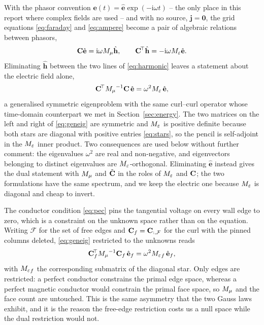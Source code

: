 With the phasor convention $\mathbf{e}(t)=\hat{\mathbf{e}}\exp(-\mathrm{i}\omega t)$ -- the only
place in this
report where complex fields are used -- and with no source, $\mathbf{j}=\mathbf{0}$, the grid
equations
\eqref{eq:faraday} and \eqref{eq:ampere} become a pair of algebraic relations between phasors,
\begin{equation}
  \mathbf{C}\hat{\mathbf{e}} = \mathrm{i}\omega{M_{\mu}}\hat{\mathbf{h}}, \qquad
  \mathbf{C}^{\!\top}\hat{\mathbf{h}} = -\mathrm{i}\omega{M_{\varepsilon}}\hat{\mathbf{e}}.
  \label{eq:harmonic}
\end{equation}
Eliminating $\hat{\mathbf{h}}$ between the two lines of \eqref{eq:harmonic} leaves a statement
about the electric
field alone,
\begin{equation}
  \mathbf{C}^{\!\top}{M_{\mu}}^{-1}\mathbf{C}\,\hat{\mathbf{e}} = \omega^{2}{M_{\varepsilon}}\,\hat{\mathbf{e}},
  \label{eq:geneig}
\end{equation}
a generalised symmetric eigenproblem with the same curl--curl operator whose time-domain
counterpart we met in
Section~\ref{sec:energy}. The two matrices on the left and right of \eqref{eq:geneig} are symmetric
and
${M_{\varepsilon}}$ is positive definite because both stars are diagonal with positive entries \eqref{eq:stars},
so the pencil
is self-adjoint in the ${M_{\varepsilon}}$ inner product. Two consequences are used below without further
comment: the
eigenvalues $\omega^{2}$ are real and non-negative, and eigenvectors belonging to distinct
eigenvalues are
${M_{\varepsilon}}$-orthogonal. Eliminating $\hat{\mathbf{e}}$ instead gives the dual statement with ${M_{\mu}}$ and
$\tilde{\mathbf{C}}$ in the roles of ${M_{\varepsilon}}$ and $\mathbf{C}$; the two formulations have the same spectrum, and
we keep the
electric one because ${M_{\varepsilon}}$ is diagonal and cheap to invert.

The conductor condition \eqref{eq:pec} pins the tangential voltage on every wall edge to zero,
which is a
constraint on the unknown space rather than on the equation. Writing $\mathcal{F}$ for the set of
free edges and
$\mathbf{C}_f=\mathbf{C}_{:,\mathcal{F}}$ for the curl with the pinned columns deleted, \eqref{eq:geneig}
restricted to the
unknowns reads
\begin{equation}
  \mathbf{C}_f^{\!\top}{M_{\mu}}^{-1}\mathbf{C}_f\,\hat{\mathbf{e}}_f = \omega^{2}{M_{\varepsilon}}_f\,\hat{\mathbf{e}}_f,
  \label{eq:geneig-f}
\end{equation}
with ${M_{\varepsilon}}_f$ the corresponding submatrix of the diagonal star. Only edges are restricted: a perfect
conductor
constrains the primal edge space, whereas a perfect magnetic conductor would constrain the primal
face space, so
${M_{\mu}}$ and the face count are untouched. This is the same asymmetry that the two Gauss laws exhibit,
and it is the
reason the free-edge restriction costs us a null space while the dual restriction would not.

